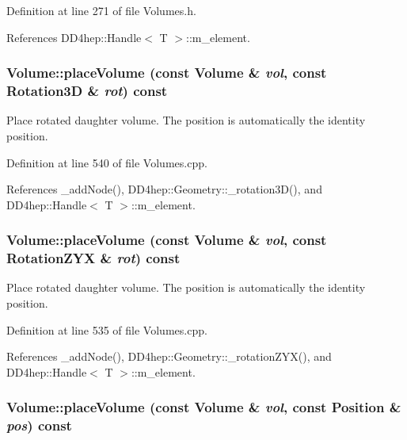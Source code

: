 Definition at line 271 of file Volumes.h.

References DD4hep::Handle$<$ T $>$::m\_\-element.\hypertarget{class_d_d4hep_1_1_geometry_1_1_volume_a5087814789bfdbf06b46b2569191a9c6}{
\subsubsection[{placeVolume}]{ Volume::placeVolume (const {\bf Volume} \& {\em vol}, \/  const {\bf Rotation3D} \& {\em rot}) const}}
\label{class_d_d4hep_1_1_geometry_1_1_volume_a5087814789bfdbf06b46b2569191a9c6}


Place rotated daughter volume. The position is automatically the identity position. 

Definition at line 540 of file Volumes.cpp.

References \_\-addNode(), DD4hep::Geometry::\_\-rotation3D(), and DD4hep::Handle$<$ T $>$::m\_\-element.\hypertarget{class_d_d4hep_1_1_geometry_1_1_volume_a26ca4b9a6bebdb8d6f8245ac64296f28}{
\subsubsection[{placeVolume}]{ Volume::placeVolume (const {\bf Volume} \& {\em vol}, \/  const {\bf RotationZYX} \& {\em rot}) const}}
\label{class_d_d4hep_1_1_geometry_1_1_volume_a26ca4b9a6bebdb8d6f8245ac64296f28}


Place rotated daughter volume. The position is automatically the identity position. 

Definition at line 535 of file Volumes.cpp.

References \_\-addNode(), DD4hep::Geometry::\_\-rotationZYX(), and DD4hep::Handle$<$ T $>$::m\_\-element.\hypertarget{class_d_d4hep_1_1_geometry_1_1_volume_aeee43002378b1a0332d6b0ccdf4969b9}{
\subsubsection[{placeVolume}]{ Volume::placeVolume (const {\bf Volume} \& {\em vol}, \/  const {\bf Position} \& {\em pos}) const}}
\label{class_d_d4hep_1_1_geometry_1_1_volume_aeee43002378b1a0332d6b0ccdf4969b9}


